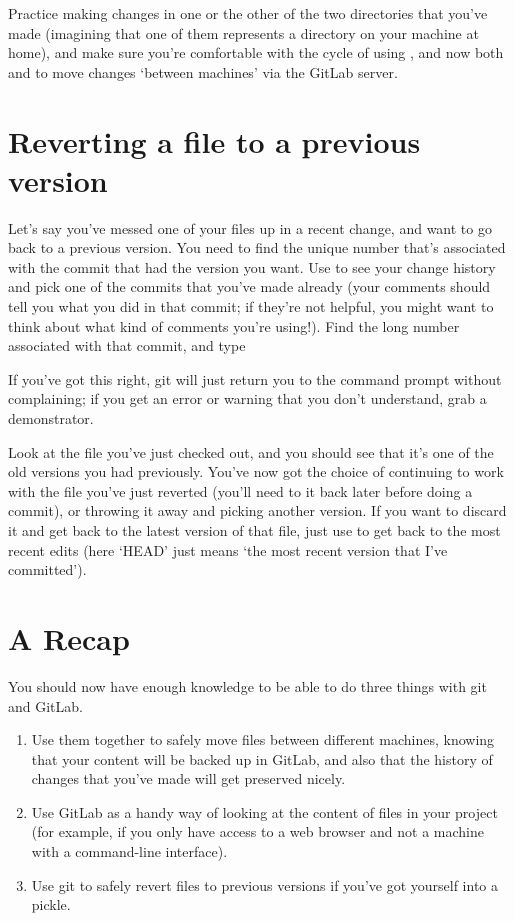 Practice making changes in one or the other of the two  directories that you've made (imagining that one of them represents a directory on your machine at home), and make sure you're comfortable with the cycle of using ,  and now both  and  to move changes `between machines' via the GitLab server.

\section{Reverting a file to a previous version}

Let's say you've messed one of your files up in a recent change, and want to go back to a previous version. You need to find the unique number that's associated with the commit that had the version you want. Use  to see your change history and pick one of the commits that you've made already (your comments should tell you what you did in that commit; if they're not helpful, you might want to think about what kind of comments you're using!). Find the long number associated with that commit, and type


If you've got this right, git will just return you to the command prompt without complaining; if you get an error or warning that you don't understand, grab a demonstrator. 

Look at the file you've just checked out, and you should see that it's one of the old versions you had previously. You've now got the choice of continuing to work with the file you've just reverted (you'll need to  it back later before doing a commit), or throwing it away and picking another version. If you want to discard it and get back to the latest version of that file, just use  to get back to the most recent edits (here `HEAD' just means `the most recent version that I've committed').

\section{A Recap}

You should now have enough knowledge to be able to do three things with git and GitLab.

\begin{enumerate}
\item Use them together to safely move files between different machines, knowing that your content will be backed up in GitLab, and also that the history of changes that you've made will get preserved nicely.
\item Use GitLab as a handy way of looking at the content of files in your project (for example, if you only have access to a web browser and not a machine with a command-line interface).
\item Use git to safely revert files to previous versions if you've got yourself into a pickle. 
\end{enumerate}

